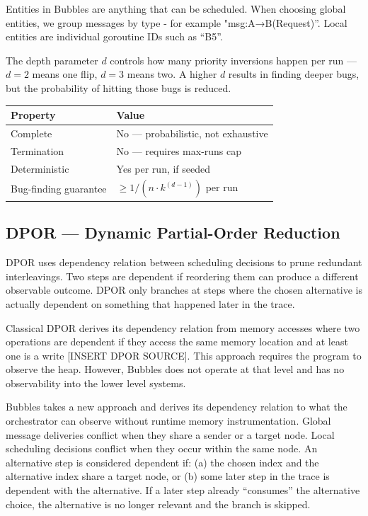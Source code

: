 \documentclass[11pt]{article}
\begin{document}
Entities in Bubbles are anything that can be scheduled. When choosing global entities, we group messages by type - for example "msg:A→B(Request)”. Local entities are individual goroutine IDs such as “B5”. 

The depth parameter $d$ controls how many priority inversions happen per run --- $d=2$ means one flip, $d=3$ means two. A higher $d$ results in finding deeper bugs, but the probability of hitting those bugs is reduced.

\begin{center}
\begin{tabular}{@{}ll@{}}
\toprule
Property & Value \\
\midrule
Complete & No --- probabilistic, not exhaustive \\
Termination & No --- requires max-runs cap \\
Deterministic & Yes per run, if seeded \\
Bug-finding guarantee & $\geq 1/(n \cdot k^{(d-1)})$ per run \\
\bottomrule
\end{tabular}
\end{center}

\subsection{DPOR --- Dynamic Partial-Order Reduction}
DPOR uses dependency relation between scheduling decisions to prune redundant interleavings. Two steps are dependent if reordering them can produce a different observable outcome. DPOR only branches at steps where the chosen alternative is actually dependent on something that happened later in the trace.

Classical DPOR derives its dependency relation from memory accesses where two operations are dependent if they access the same memory location and at least one is a write [INSERT DPOR SOURCE]. This approach requires the program to observe the heap. However, Bubbles does not operate at that level and has no observability into the lower level systems. 

Bubbles takes a new approach and derives its dependency relation to what the orchestrator can observe without runtime memory instrumentation. Global message deliveries conflict when they share a sender or a target node. Local scheduling decisions conflict when they occur within the same node. An alternative step is considered dependent if: (a) the chosen index and the alternative index share a target node, or (b) some later step in the trace is dependent with the alternative. If a later step already “consumes” the alternative choice, the alternative is no longer relevant and the branch is skipped.
\end{document}

